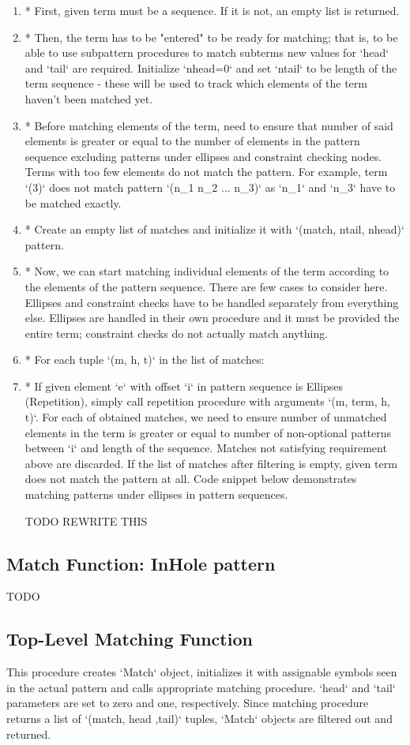 \begin{enumerate}
\item
* First, given term must be a sequence. If it is not, an empty list is returned.
\item
* Then, the term has to be "entered" to be ready for matching; that is, to be able to use subpattern procedures to match subterms new values for `head` and `tail` are required. Initialize `nhead=0` and set `ntail` to be length of the term sequence - these will be used to track which elements of the term haven't been matched yet.
\item
* Before matching elements of the term, need to ensure that number of said elements is greater or equal to the number of elements in the pattern sequence excluding patterns under ellipses and constraint checking nodes. Terms with too few elements do not match the pattern. For example, term `(3)` does not match pattern `(n\_1 n\_2 ... n\_3)` as `n\_1` and `n\_3` have to be matched exactly.
\item
* Create an empty list of matches and initialize it with `(match, ntail, nhead)` pattern.
\item
* Now, we can start matching individual elements of the term according to the elements of the pattern sequence. There are few cases to consider here. Ellipses and constraint checks have to be handled separately from everything else.  Ellipses are handled in their own procedure and it must be provided the entire term; constraint checks do not actually match anything.
\item
* For each tuple `(m, h, t)` in the list of matches:
\item
* If given element `e` with offset `i` in pattern sequence is Ellipses (Repetition), simply call repetition procedure with arguments `(m, term, h, t)`. For each of obtained matches, we need to ensure number of unmatched elements in the term is greater or equal to number of non-optional patterns between `i` and length of the sequence. Matches not satisfying requirement above are discarded. If the list of matches after filtering is empty, given term does not match the pattern at all. Code snippet below demonstrates matching patterns under ellipses in pattern sequences.

TODO REWRITE THIS 
\end{enumerate}

\subsection{Match Function: InHole pattern}
TODO

\subsection{Top-Level Matching Function}

This procedure creates `Match` object, initializes it with assignable symbols seen in the actual pattern and calls appropriate matching procedure. `head` and `tail` parameters are set to zero and one, respectively. Since matching procedure returns a list of `(match, head ,tail)` tuples, `Match` objects are filtered out and returned.

